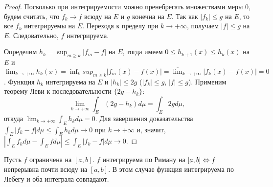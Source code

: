 \begin{proof}
    Посколько при интегрируемости можно пренебрегать множествами меры 0, будем считать, что $f_{k} \to f$ всюду на $E$ и $g$ конечна на $E$. Так как $|f_{k}| \leq g$ на $E$, то все $f_{k}$ интегрируемы на $E$. Переходя к пределу при $k \to +\infty$, получаем $|f| \leq g$ на $E$. Следовательно, $f$ интегрируема.
    
    Определим $h_{k} = \sup_{m \geq k}|f_{m} - f|$ на $E$, тогда имеем $0 \leq h_{k+1}(x) \leq h_{k}(x)$ на $E$ и $\lim_{k \to +\infty}h_{k}(x) = \inf_{k}sup_{m \geq k}|f_{m}(x) - f(x)| = \overline{\lim}_{k \to + \infty}|f_{k}(x) - f(x)| = 0$.
    Функция $h_{k}$ интегрируема на $E$ и $|h_{k}| \leq 2g$ ($|f_{k}| \leq g$, $|f| \leq g$). Применим теорему Леви к последовательности $\{2g - h_{k}\}$: 
    \[\lim_{k \to +\infty}\int_{E}(2g - h_{k}) d\mu = \int_{E}2g d\mu,\]
    откуда $\lim_{k \to +\infty}\int_{E}h_{k} d\mu = 0$. Для завершения доказательства $\int_{E}|f_{k} - f| d\mu \leq \int_{E}h_{k} d\mu \to 0$ при $k \to +\infty$ и, значит, $\left|\int_{E}f_{k} d\mu - \int_{E}f d\mu\right| \leq \int_{E}|f_{k} - f| d\mu \to 0$.
\end{proof}

\begin{theorem}
    Пусть $f$ ограничена на $[a, b]$. $f$ интегрируема по Риману на $[a, b] \Leftrightarrow f$ непрерывна почти всюду на $[a, b]$. В этом случае функция интегрируема по Лебегу и оба интеграла совпадают. 
\end{theorem}

